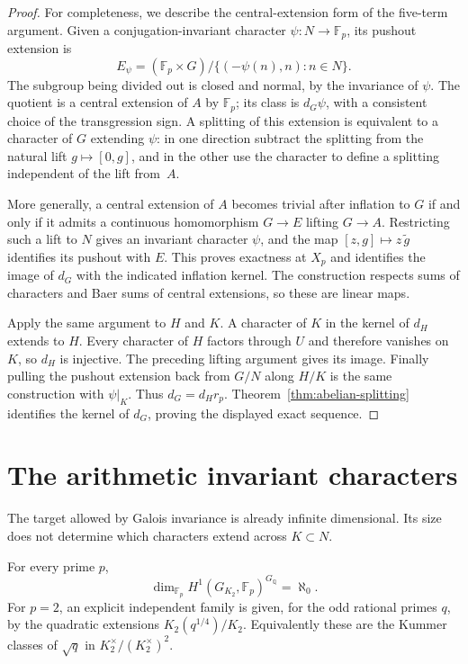 \begin{proof}
For completeness, we describe the central-extension form of the
five-term argument. Given a conjugation-invariant character
$\psi:N\to\mathbb F_p$, its pushout extension is
\[
 E_\psi=(\mathbb F_p\times G)/
       \{(-\psi(n),n):n\in N\}.
\]
The subgroup being divided out is closed and normal, by the invariance
of $\psi$. The quotient is a central extension of $A$ by $\mathbb F_p$;
its class is $d_G\psi$, with a consistent choice of the transgression
sign. A splitting of this extension is equivalent to a character of
$G$ extending $\psi$: in one direction subtract the splitting from the
natural lift $g\mapsto[0,g]$, and in the other use the character to
define a splitting independent of the lift from~$A$.

More generally, a central extension of $A$ becomes trivial after
inflation to $G$ if and only if it admits a continuous homomorphism
$G\to E$ lifting $G\to A$. Restricting such a lift to $N$ gives an
invariant character $\psi$, and the map
$[z,g]\mapsto z\,\widetilde g$ identifies its pushout with $E$.
This proves exactness at $X_p$ and identifies the image of $d_G$ with
the indicated inflation kernel. The construction respects sums of
characters and Baer sums of central extensions, so these are linear
maps.

Apply the same argument to $H$ and $K$. A character of $K$ in the
kernel of $d_H$ extends to $H$. Every character of $H$ factors through
$U$ and therefore vanishes on $K$, so $d_H$ is injective. The preceding
lifting argument gives its image. Finally pulling the pushout extension
back from $G/N$ along $H/K$ is the same construction with $\psi|_K$.
Thus $d_G=d_Hr_p$. Theorem~\ref{thm:abelian-splitting} identifies the
kernel of $d_G$, proving the displayed exact sequence.
\end{proof}

\section{The arithmetic invariant characters}
\label{sec:arithmetic-target}

The target allowed by Galois invariance is already infinite dimensional.
Its size does not determine which characters extend across $K\subset N$.

\begin{theorem}\label{thm:arithmetic-target-dimension}
For every prime $p$,
\[
 \dim_{\mathbb F_p}H^1(G_{K_2},\mathbb F_p)^{G_{\mathbb Q}}=\aleph_0.
\]
For $p=2$, an explicit independent family is given, for the odd rational
primes $q$, by the quadratic extensions $K_2(q^{1/4})/K_2$.
Equivalently these are the Kummer classes of $\sqrt q$ in
$K_2^\times/(K_2^\times)^2$.
\end{theorem}

